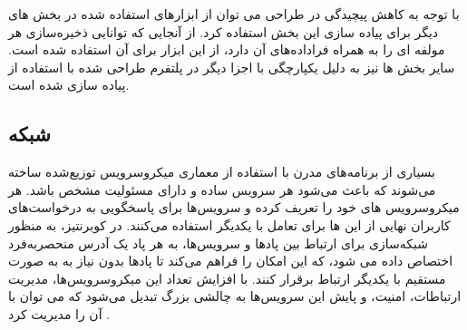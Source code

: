 با توجه به کاهش پیچیدگی در طراحی می توان از ابزارهای استفاده شده در بخش های دیگر برای پیاده سازی این بخش استفاده کرد. از آنجایی که  توانایی ذخیره‌سازی هر مولفه ای را به همراه فراداده‌های آن دارد،‌ از این ابزار برای  آن استفاده شده است. سایر بخش ها نیز به دلیل یکپارچگی با اجزا دیگر در پلتفرم طراحی شده با استفاده از  پیاده سازی شده است.
\subsection{شبکه}
بسیاری از برنامه‌های مدرن با استفاده از معماری میکروسرویس توزیع‌شده ساخته می‌شوند که باعث می‌شود هر سرویس ساده و دارای مسئولیت مشخص باشد. هر میکروسرویس های خود را تعریف کرده و سرویس‌ها برای پاسخگویی به درخواست‌های کاربران نهایی از این ها برای تعامل با یکدیگر استفاده می‌کنند. در کوبرنتیز، به منظور شبکه‌سازی برای ارتباط بین پادها و سرویس‌ها، به هر پاد یک آدرس  منحصربه‌فرد اختصاص داده می شود، که این امکان را فراهم می‌کند تا پادها بدون نیاز به  به صورت مستقیم با یکدیگر ارتباط برقرار کنند. با افزایش تعداد این میکروسرویس‌ها، مدیریت ارتباطات، امنیت، و پایش این سرویس‌ها به چالشی بزرگ تبدیل می‌شود که می توان با  آن را مدیریت کرد \cite{Istio1}.

